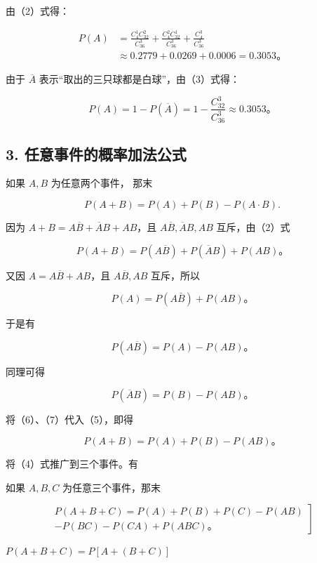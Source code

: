 由（2）式得：

\[
\begin{aligned}
P(A)&=\frac{C_4^1C_{32}^2}{C_{36}^3}+\frac{C_4^2C_{32}^1}{C_{36}^3}+\frac{C_4^3}{C_{36}^3}\\
&\approx0.2779+0.0269+0.0006=0.3053\text{。}
\end{aligned}
\]

 由于 \(\overline{A}\)
表示``取出的三只球都是白球''，由（3）式得：

\[
P(A)=1-P(\overline A)=1-\frac{C_{32}^3}{C_{36}^3}\approx0.3053\text{。}
\]

\subsection{3. 任意事件的概率加法公式}

如果 \(A, B\) 为任意两个事件， 那末

\[
\boxed {P (A + B) = P (A) + P (B) - P (A \cdot B).} \tag {4}
\]

 因为 \(A + B = A\overline{B} + \overline{A} B + AB\)，且
\(A\overline{B}, \overline{A}B, AB\) 互斥，由（2）式

\[
P (A + B) = P (A \overline {{{B}}}) + P (\overline {{{A}}} B) + P (A B)\text{。} \tag {5}
\]

又因 \(A = A\overline{B} + AB\)，且 \(A\overline{B}, AB\) 互斥，所以

\[
P (A) = P (A \bar {B}) + P (A B)\text{。}
\]

于是有

\[
P (A \overline {{{B}}}) = P (A) - P (A B)\text{。} \tag {6}
\]

同理可得

\[
P (\overline {{{A}}} B) = P (B) - P (A B)\text{。} \tag {7}
\]

将（6）、（7）代入（5），即得

\[
P (A + B) = P (A) + P (B) - P (A B)\text{。}
\]

将（4）式推广到三个事件。有

如果 \(A, B, C\) 为任意三个事件，那末

\[
\left. \begin{array}{c} P (A + B + C) = P (A) + P (B) + P (C) - P (A B) \\ - P (B C) - P (C A) + P (A B C)\text{。} \end{array} \right] \tag {8}
\]

 \(P(A + B + C) = P[A + (B + C)]\)

